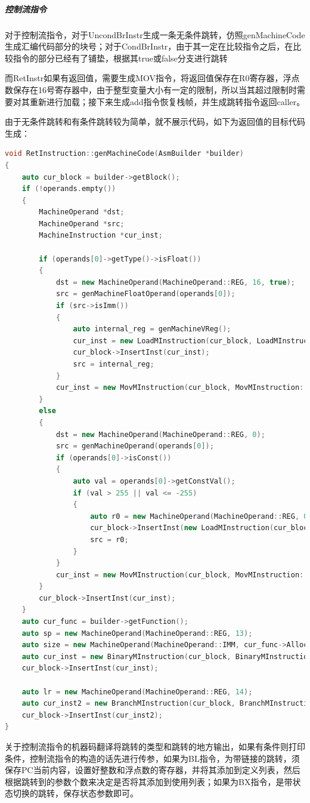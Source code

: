 \documentclass[UTF8,a4paper,10pt]{ctexart}
\begin{document}
\subparagraph{控制流指令}
对于控制流指令，对于UncondBrInstr生成一条无条件跳转，仿照genMachineCode生成汇编代码部分的块号；对于CondBrInstr，由于其一定在比较指令之后，在比较指令的部分已经有了铺垫，根据其true或false分支进行跳转

而RetInstr如果有返回值，需要生成MOV指令，将返回值保存在R0寄存器，浮点数保存在16号寄存器中，由于整型变量大小有一定的限制，所以当其超过限制时需要对其重新进行加载；接下来生成add指令恢复栈帧，并生成跳转指令返回caller。

由于无条件跳转和有条件跳转较为简单，就不展示代码，如下为返回值的目标代码生成：
\begin{lstlisting}[title = 生成目标代码, language = c++]
void RetInstruction::genMachineCode(AsmBuilder *builder)
{
    auto cur_block = builder->getBlock();
    if (!operands.empty())
    {
        MachineOperand *dst;
        MachineOperand *src;
        MachineInstruction *cur_inst;

        if (operands[0]->getType()->isFloat())
        {
            dst = new MachineOperand(MachineOperand::REG, 16, true);
            src = genMachineFloatOperand(operands[0]);
            if (src->isImm())
            {
                auto internal_reg = genMachineVReg();
                cur_inst = new LoadMInstruction(cur_block, LoadMInstruction::LDR, internal_reg, src);
                cur_block->InsertInst(cur_inst);
                src = internal_reg;
            }
            cur_inst = new MovMInstruction(cur_block, MovMInstruction::VMOV, dst, src);
        }
        else
        {
            dst = new MachineOperand(MachineOperand::REG, 0);
            src = genMachineOperand(operands[0]);
            if (operands[0]->isConst())
            {
                auto val = operands[0]->getConstVal();
                if (val > 255 || val <= -255)
                {
                    auto r0 = new MachineOperand(MachineOperand::REG, 0);
                    cur_block->InsertInst(new LoadMInstruction(cur_block, LoadMInstruction::LDR, r0, src));
                    src = r0;
                }
            }
            cur_inst = new MovMInstruction(cur_block, MovMInstruction::MOV, dst, src);
        }
        cur_block->InsertInst(cur_inst);
    }
    auto cur_func = builder->getFunction();
    auto sp = new MachineOperand(MachineOperand::REG, 13);
    auto size = new MachineOperand(MachineOperand::IMM, cur_func->AllocSpace(0));
    auto cur_inst = new BinaryMInstruction(cur_block, BinaryMInstruction::ADD, sp, sp, size);
    cur_block->InsertInst(cur_inst);

    auto lr = new MachineOperand(MachineOperand::REG, 14);
    auto cur_inst2 = new BranchMInstruction(cur_block, BranchMInstruction::BX, lr);
    cur_block->InsertInst(cur_inst2);
}
\end{lstlisting}
关于控制流指令的机器码翻译将跳转的类型和跳转的地方输出，如果有条件则打印条件，控制流指令的构造的话先进行传参，如果为BL指令，为带链接的跳转，须保存PC当前内容，设置好整数和浮点数的寄存器，并将其添加到定义列表，然后根据跳转到的参数个数来决定是否将其添加到使用列表；如果为BX指令，是带状态切换的跳转，保存状态参数即可。
\end{document}
